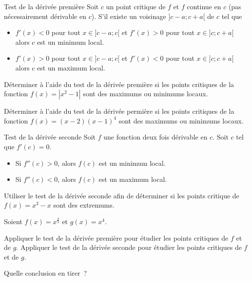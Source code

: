 \begin{methode}
	Test de la dérivée première
	\tcblower
	Soit $c$ un point critique de $f$ et $f$ continue en $c$ (pas nécessairement dérivable en $c$). S'il existe un voisinage $]c-a;c+a[$ de $c$ tel que
	\begin{itemize}
		\item $f'(x)<0$ pour tout $x\in ]c-a;c[$ et $f'(x)>0$ pour tout $x\in]c;c+a[$ alors $c$ est un minimum local.
		\item $f'(x)>0$ pour tout $x\in ]c-a;c[$ et $f'(x)<0$ pour tout $x\in]c;c+a[$ alors $c$ est un maximum local.
	\end{itemize}
\end{methode}
\begin{exemple}
	\tcblower
	Déterminer à l'aide du test de la dérivée première si les points critiques de la fonction $f(x)=|x^2-1|$ sont des maximums ou minimums locaux. 
	\vspace{10cm}
\end{exemple}
\begin{exemple}
	\tcblower
	Déterminer à l'aide du test de la dérivée permière si les points critiques de la fonction $f(x)=(x-2)(x-1)^4$ sont des maximums ou minimums locaux. 
	\vspace{7cm}
\end{exemple}
\begin{methode}
	Test de la dérivée seconde
	\tcblower
	Soit $f$ une fonction deux fois dérivable en $c$. Soit $c$ tel que $f'(c)=0$.
	\begin{itemize}
		\item Si $f''(c)>0$, alors $f(c)$ est un minimum local.
		\item Si $f''(c)<0$, alors $f(c)$ est un maximum local. 
	\end{itemize}
\end{methode}
\begin{exemple}
	\tcblower
	Utiliser le test de la dérivée seconde afin de déterminer si les points critique de $f(x)=x^3-x$ sont des extremums. 
	\vspace{10cm}
\end{exemple}
\begin{activite}
	\tcblower
	Soient $f(x)=x^{\frac{4}{3}}$ et $g(x)=x^4$. 
\begin{tasks}
\task 	Appliquer le test de la dérivée première pour étudier les points critiques de $f$ et de $g$.
\task 	Appliquer le test de la dérivée seconde pour étudier les points critiques de $f$ et de $g$.
\end{tasks}
Quelle conclusion en tirer~?
\end{activite}
